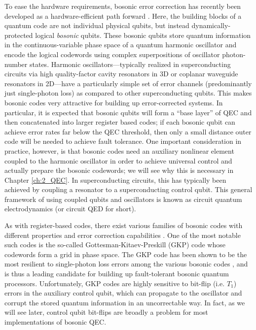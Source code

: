 To ease the hardware requirements, bosonic error correction has recently been developed as a hardware-efficient path forward \cite{terhal2020bosonic, cai2021bosonic, joshi2021bosonic}. Here, the building blocks of a quantum code are not individual physical qubits, but instead dynamically-protected logical \textit{bosonic} qubits. These bosonic qubits store quantum information in the continuous-variable phase space of a quantum harmonic oscillator and encode the logical codewords using complex superpositions of oscillator photon-number states. Harmonic oscillators---typically realized in superconducting circuits via high quality-factor cavity resonators in 3D or coplanar waveguide resonators in 2D---have a particularly simple set of error channels (predominantly just single-photon loss) as compared to other superconducting qubits. This makes bosonic codes very attractive for building up error-corrected systems. In particular, it is expected that bosonic qubits will form a ``base layer'' of QEC and then concatenated into larger register based codes; if each bosonic qubit can achieve error rates far below the QEC threshold, then only a small distance outer code will be needed to achieve fault tolerance. One important consideration in practice, however, is that bosonic codes need an auxiliary nonlinear element coupled to the harmonic oscillator in order to achieve universal control and actually prepare the bosonic codewords; we will see why this is necessary in Chapter \ref{ch:2_QEC}. In superconducting circuits, this has typically been achieved by coupling a resonator to a  superconducting control qubit. This general framework of using coupled qubits and oscillators is known as circuit quantum electrodynamics (or circuit QED for short). 

As with register-based codes, there exist various families of bosonic codes with different properties and error correction capabilities \cite{joshi2021bosonic}. One of the most notable such codes is the so-called Gottesman-Kitaev-Preskill (GKP) code whose codewords form a grid in phase space. The GKP code has been shown to be the most resilient to single-photon loss errors among the various bosonic codes \cite{albert2018performance-and-structure, noh2018performance-and-structure-pt2}, and is thus a leading candidate for building up fault-tolerant bosonic quantum processors. Unfortunately, GKP codes are highly sensitive to bit-flip (i.e. $T_1$) errors in the auxiliary control qubit, which can propagate to the oscillator and corrupt the stored quantum information in an uncorrectable way. In fact, as we will see later, control qubit bit-flips are broadly a problem for most implementations of bosonic QEC. 


